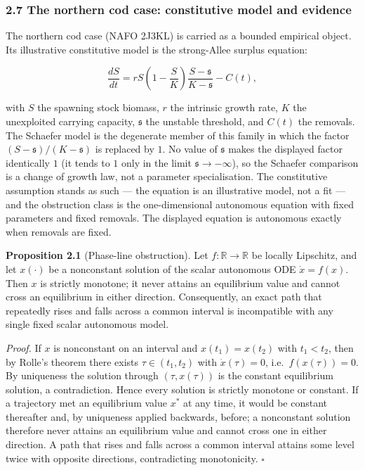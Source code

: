 \documentclass[11pt]{article}
\begin{document}
\subsubsection{2.7 The northern cod case: constitutive model and
evidence}\label{the-northern-cod-case-constitutive-model-and-evidence}

The northern cod case (NAFO 2J3KL) is carried as a bounded empirical
object. Its illustrative constitutive model is the strong-Allee surplus
equation:

\[
\frac{dS}{dt}=rS\left(1-\frac{S}{K}\right)\frac{S-\mathfrak s}{K-\mathfrak s}-C(t),
\tag{5}
\]

with \(S\) the spawning stock biomass, \(r\) the intrinsic growth rate,
\(K\) the unexploited carrying capacity, \(\mathfrak s\) the unstable
threshold, and \(C(t)\) the removals. The Schaefer model is the
degenerate member of this family in which the factor
\((S-\mathfrak s)/(K-\mathfrak s)\) is replaced by \(1\). No value of
\(\mathfrak s\) makes the displayed factor identically \(1\) (it tends
to \(1\) only in the limit \(\mathfrak s\to-\infty\)), so the Schaefer
comparison is a change of growth law, not a parameter specialisation.
The constitutive assumption stands as such --- the equation is an
illustrative model, not a fit --- and the obstruction class is the
one-dimensional autonomous equation with fixed parameters and fixed
removals. The displayed equation is autonomous exactly when removals are
fixed.

\textbf{Proposition 2.1} (Phase-line obstruction). Let
\(f:\mathbb{R}\to\mathbb{R}\) be locally Lipschitz, and let \(x(\cdot)\)
be a nonconstant solution of the scalar autonomous ODE \(\dot x=f(x)\).
Then \(x\) is strictly monotone; it never attains an equilibrium value
and cannot cross an equilibrium in either direction. Consequently, an
exact path that repeatedly rises and falls across a common interval is
incompatible with any single fixed scalar autonomous model.

\emph{Proof.} If \(x\) is nonconstant on an interval and
\(x(t_1)=x(t_2)\) with \(t_1<t_2\), then by Rolle's theorem there exists
\(\tau\in(t_1,t_2)\) with \(\dot x(\tau)=0\), i.e.~\(f(x(\tau))=0\). By
uniqueness the solution through \((\tau,x(\tau))\) is the constant
equilibrium solution, a contradiction. Hence every solution is strictly
monotone or constant. If a trajectory met an equilibrium value \(x^*\)
at any time, it would be constant thereafter and, by uniqueness applied
backwards, before; a nonconstant solution therefore never attains an
equilibrium value and cannot cross one in either direction. A path that
rises and falls across a common interval attains some level twice with
opposite directions, contradicting monotonicity. \ensuremath{\square}
\end{document}
